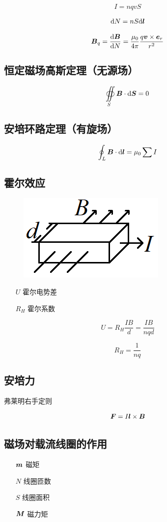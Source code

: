 \documentclass{article}
\begin{document}
\[I=nqvS\]

\[\mathrm d N=nS\mathrm d\boldsymbol{l}\]

\[\boldsymbol{B}_q=\frac{\mathrm d\boldsymbol{B}}{\mathrm d N}=\frac{\mu_0}{4\pi}\frac{q\boldsymbol{v}\times\boldsymbol{e}_r}{r^2}\]

\subsection{恒定磁场高斯定理（无源场）}

\[\oiint\limits_S\boldsymbol{B}\cdot\mathrm d\boldsymbol{S}=0\]

\subsection{安培环路定理（有旋场）}

\[\oint_L\boldsymbol{B}\cdot\mathrm d\boldsymbol{l}=\mu_0\sum I\]

\subsection{霍尔效应}

\begin{figure}[H]
    \centering
    \includegraphics[width=0.2\linewidth]{HallEffect.png}
\end{figure}

\begin{enumerate}
    \item [$U$] 霍尔电势差
    \item [$R_H$] 霍尔系数
\end{enumerate}

\[U=R_H\frac{IB}d=\frac{IB}{nqd}\]

\[R_H=\frac1{nq}\]

\subsection{安培力}

弗莱明右手定则

\[\boldsymbol{F}=I\boldsymbol{l}\times\boldsymbol{B}\]

\subsection{磁场对载流线圈的作用}

\begin{enumerate}
    \item [$\boldsymbol{m}$] 磁矩
    \item [$N$] 线圈匝数
    \item [$S$] 线圈面积
    \item [$\boldsymbol{M}$] 磁力矩
\end{enumerate}
\end{document}
